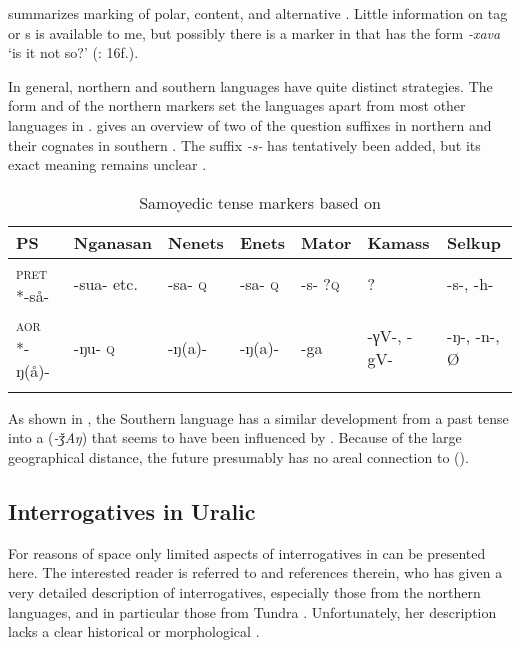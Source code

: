  summarizes marking of polar, content, and alternative . Little information on tag or s is available to me, but possibly there is a  marker in  that has the form \textit{-xava} ‘is it not so?’ (\citealt{Miestamo2011}: 16f.).

In general, northern and southern  languages have quite distinct  strategies. The form and  of the northern  markers set the languages apart from most other languages in .  gives an overview of two of the question suffixes in northern  and their cognates in southern . The  suffix \textit{-s-} has tentatively been added, but its exact meaning remains unclear \citep[164]{Helimski1997}.

\begin{table}
\caption{Samoyedic tense markers based on \cite[115f.]{Mikola2004}}
\label{tab:ural:3}

\begin{tabularx}{\textwidth}{lXXXXll}
\lsptoprule

\textbf{PS} & \textbf{Nganasan} & \textbf{Nenets} & \textbf{Enets} & \textbf{Mator} & \textbf{Kamass} & \textbf{Selkup}\\
\midrule
\textsc{pret} *-så- & -sua- etc. & -sa- \textsc{q} & -sa- \textsc{q} & -s- ?\textsc{q} & ? & -s-, -h-\\
\textsc{aor} *-ŋ(å)- & -ŋu- \textsc{q} & -ŋ(a)- & -ŋ(a)- & -ga & -γV-, -gV- & -ŋ-, -n-, Ø\\
\lspbottomrule
\end{tabularx}
\end{table}

As shown in , the Southern  language  has a similar development from a past tense into a  (\textit{-ǯAŋ}) that seems to have been influenced by . Because of the large geographical distance, the  future  presumably has no areal connection to  ().

\subsection{Interrogatives in Uralic}\label{sec:5.12.3}

For reasons of space only limited aspects of interrogatives in  can be presented here. The interested reader is referred to \cite{Mus2009,Mus2013,Mus2015b} and references therein, who has given a very detailed description of  interrogatives, especially those from the northern languages, and in particular those from Tundra . Unfortunately, her description lacks a clear historical or morphological .

